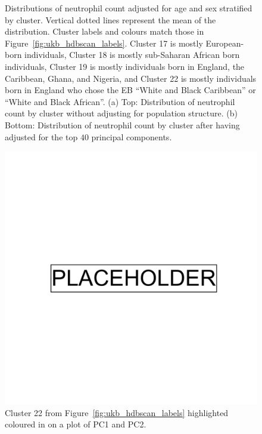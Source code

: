 \begin{figure}[ht]
\begin{subfigure}[b]{0.7\linewidth}
    \caption{}
    \label{fig:supp_pheno_ridge_neut_post}
  \end{subfigure}
  \caption[Distributions of neutrophil count by cluster]{Distributions of neutrophil count adjusted for age and sex stratified by cluster. Vertical dotted lines represent the mean of the distribution. Cluster labels and colours match those in Figure~\ref{fig:ukb_hdbscan_labels}. Cluster 17 is mostly European-born individuals, Cluster 18 is mostly sub-Saharan African born individuals, Cluster 19 is mostly individuals born in England, the Caribbean, Ghana, and Nigeria, and Cluster 22 is mostly individuals born in England who chose the EB ``White and Black Caribbean'' or ``White and Black African''. (a) Top: Distribution of neutrophil count by cluster without adjusting for population structure. (b) Bottom: Distribution of neutrophil count by cluster after having adjusted for the top $40$ principal components.}
  \label{fig:supp_pheno_ridge_neut}
\end{figure}

\clearpage

\begin{figure}[ht]
  \centering
    \includegraphics[width=0.9\linewidth]{placeholder.png}
  \caption{Cluster 22 from Figure~\ref{fig:ukb_hdbscan_labels} highlighted coloured in on a plot of PC1 and PC2.}
  \label{fig:supp_cluster_22_pca}
\end{figure}

